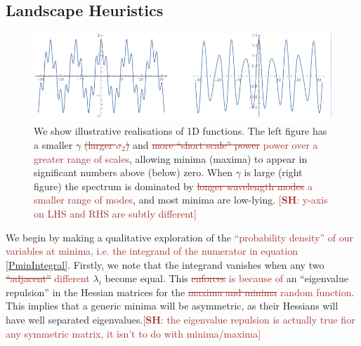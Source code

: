 \documentclass[12pt]{article}
\newcommand{\SH}[1]{\textcolor{brown}{[{\bf SH}: #1]}}
\newcommand{\sh}[1]{\textcolor{brown}{#1}}
\begin{document}
\subsection{Landscape Heuristics}
\begin{figure}
  \centering
  
  \includegraphics[width=\linewidth]{TwoSigmas.png}
  \caption{We show illustrative realisations of 1D functions. The left figure has a smaller $\gamma$ \sh{\sout{(larger $\sigma_2$)}} and \sh{\sout{more “short scale” power} power over a greater range of scales}, allowing minima (maxima) to appear in significant numbers above (below) zero. When $\gamma$ is large (right figure) the spectrum is dominated by \sh{\sout{longer wavelength modes} a smaller range of modes}, and most minima are low-lying. \SH{y-axis on LHS and RHS are subtly different}}
  \label{examples1}
\end{figure}

We begin by making a qualitative exploration of the \sh{``probability density'' of our variables at minima, i.e. the integrand of the numerator in equation \eqref{PminIntegral}}. Firstly, we note that the integrand vanishes when any two \sh{\sout{``adjacent''} different} $\lambda_i$ become equal. This \sh{\sout{enforces} is because of} an ``eigenvalue repulsion'' in the Hessian matrices for the \sh{\sout{maxima and minima} random function}. This implies that a generic minima will be asymmetric, as their Hessians will have well separated eigenvalues.\SH{the eigenvalue repulsion is actually true fior any symmetric matrix, it isn't to do with minima/maxima}
\end{document}
